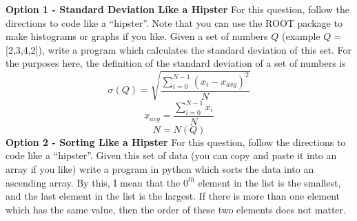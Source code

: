 \documentclass[12pt]{article}
\begin{document}
\textbf{Option 1 - Standard Deviation Like a Hipster}
\newline
For this question, follow the directions to code like a ``hipster''.  Note that you can use the ROOT package to make histograms or graphs if you like.
\newline
\newline
Given a set of numbers $Q$ (example $Q=$[2,3,4,2]), write a program which calculates the standard deviation of this set.  For the purposes here, the definition of the standard deviation of a set of numbers is
\begin{displaymath}
\sigma(Q)=\sqrt{\frac{\displaystyle\sum_{i=0}^{N-1} (x_{i}-x_{avg})^2}{N}} 
\end{displaymath}
\begin{displaymath}
x_{avg}=\frac{\displaystyle\sum_{i=0}^{N-1} x_{i}}{N}
\end{displaymath}
\begin{displaymath}
N=N(Q)
\end{displaymath}
\newline
\newline
\textbf{Option 2 - Sorting Like a Hipster}
\newline
For this question, follow the directions to code like a ``hipster''.  
\newline
\newline
Given this set of data (you can copy and paste it into an array if you like)
\newline
\newline
[71, 51, 32, 62, 84, 109, 43, 92, 72, 41, 102, 80, 72, 69, 46, 94, 52, 95, 90, 72, 63, 70, 34, 80, 78, 34, 31, 37, 26, 41, 42, 107, 33, 108, 108, 75, 66, 23, 90, 53, 24, 70, 26, 41, 93, 24, 71, 39, 48, 66, 97, 107, 77, 71, 67, 39, 38, 107, 96, 92, 84, 46, 60, 95, 87, 90, 92, 63, 78, 78, 84, 107, 70, 108, 32, 36, 93, 108, 49, 72, 56, 43, 30, 56, 51, 97, 45, 92, 40, 43, 49, 83, 98, 28, 99, 97, 102, 89, 58, 87]
\newline
\newline
write a program in python which sorts the data into an ascending array.  By this, I mean that the $0^{th}$ element in the list is the smallest, and the last element in the list is the largest.  If there is more than one element which has the same value, then the order of these two elements does not matter.  
\newline
\newline
\end{document}
